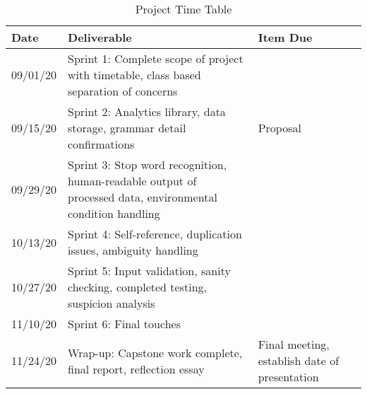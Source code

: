 \documentclass[12pt]{article}
\begin{document}
\begin{table}[p]
    \begin{center}
        \begin{tabular}{ | m{0.4in} | m{4in}| m{1.6in} | }
        \hline
        Date & Deliverable & Item Due \\ 
        \hline
        09/01/20 & Sprint 1: Complete scope of project with timetable, class based separation of concerns &   \\ 
        \hline
        09/15/20 & Sprint 2: Analytics library, data storage, grammar detail confirmations & Proposal  \\ 
        \hline
        09/29/20 & Sprint 3: Stop word recognition, human-readable output of processed data, environmental condition handling &   \\ 
        \hline
        10/13/20 & Sprint 4: Self-reference, duplication issues, ambiguity handling &   \\ 
        \hline
        10/27/20 & Sprint 5: Input validation, sanity checking, completed testing, suspicion analysis  &  \\ 
        \hline
        11/10/20 & Sprint 6: Final touches &   \\
        \hline
        11/24/20 & Wrap-up: Capstone work complete, final report, reflection essay  & Final meeting, establish date of presentation \\ 
        \hline
        \end{tabular}
        \caption{Project Time Table}
        \label{table:2}
    \end{center}
\end{table}



\end{document}
